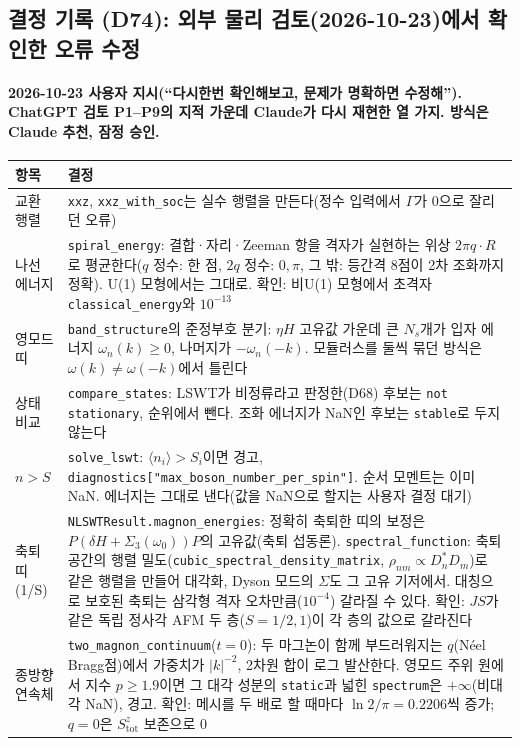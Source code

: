 \subsection{결정 기록 (D74): 외부 물리 검토(2026-10-23)에서 확인한 오류 수정}\label{decisions-d74-review-fixes}
\begingroup%
  \framesubtitle{2026-10-23 사용자 지시(``다시한번 확인해보고, 문제가 명확하면 수정해''). ChatGPT 검토 P1--P9의 지적 가운데 Claude가 다시 재현한 열 가지. 방식은 Claude 추천, 잠정 승인.}
  \small\renewcommand{\arraystretch}{1.12}
  \begin{tabularx}{\textwidth}{@{}P{3.0cm}Y@{}}
    \toprule
    항목 & 결정 \\
    \midrule
    교환 행렬 & \texttt{xxz}, \texttt{xxz\_with\_soc}는 실수 행렬을 만든다(정수 입력에서 $\Gamma$가 0으로 잘리던 오류) \\
    나선 에너지 & \texttt{spiral\_energy}: 결합·자리·Zeeman 항을 격자가 실현하는 위상 $2\pi q\cdot R$로 평균한다($q$ 정수: 한 점, $2q$ 정수: $0,\pi$, 그 밖: 등간격 8점이 2차 조화까지 정확). U(1) 모형에서는 그대로. 확인: 비U(1) 모형에서 초격자 \texttt{classical\_energy}와 $10^{-13}$ \\
    영모드 띠 & \texttt{band\_structure}의 준정부호 분기: $\eta H$ 고유값 가운데 큰 $N_s$개가 입자 에너지 $\omega_n(k)\ge0$, 나머지가 $-\omega_n(-k)$. 모듈러스를 둘씩 묶던 방식은 $\omega(k)\neq\omega(-k)$에서 틀린다 \\
    상태 비교 & \texttt{compare\_states}: LSWT가 비정류라고 판정한(D68) 후보는 \texttt{not stationary}, 순위에서 뺀다. 조화 에너지가 NaN인 후보는 \texttt{stable}로 두지 않는다 \\
    $n>S$ & \texttt{solve\_lswt}: $\langle n_i\rangle>S_i$이면 경고, \texttt{diagnostics["max\_boson\_number\_per\_spin"]}. 순서 모멘트는 이미 NaN. 에너지는 그대로 낸다(값을 NaN으로 할지는 사용자 결정 대기) \\
    축퇴 띠(1/S) & \texttt{NLSWTResult.magnon\_energies}: 정확히 축퇴한 띠의 보정은 $P(\delta H+\Sigma_3(\omega_0))P$의 고유값(축퇴 섭동론). \texttt{spectral\_function}: 축퇴 공간의 행렬 밀도(\texttt{cubic\_spectral\_density\_matrix}, $\rho_{nm}\propto D_n^*D_m$)로 같은 행렬을 만들어 대각화, Dyson 모드의 $\Sigma$도 그 고유 기저에서. 대칭으로 보호된 축퇴는 삼각형 격자 오차만큼($10^{-4}$) 갈라질 수 있다. 확인: $JS$가 같은 독립 정사각 AFM 두 층($S=1/2,1$)이 각 층의 값으로 갈라진다 \\
    종방향 연속체 & \texttt{two\_magnon\_continuum}($t=0$): 두 마그논이 함께 부드러워지는 $q$(Néel Bragg점)에서 가중치가 $|k|^{-2}$, 2차원 합이 로그 발산한다. 영모드 주위 원에서 지수 $p\ge1.9$이면 그 대각 성분의 \texttt{static}과 넓힌 \texttt{spectrum}은 $+\infty$(비대각 NaN), 경고. 확인: 메시를 두 배로 할 때마다 $\ln2/\pi=0.2206$씩 증가; $q=0$은 $S^z_\mathrm{tot}$ 보존으로 0 \\

\end{tabularx}
